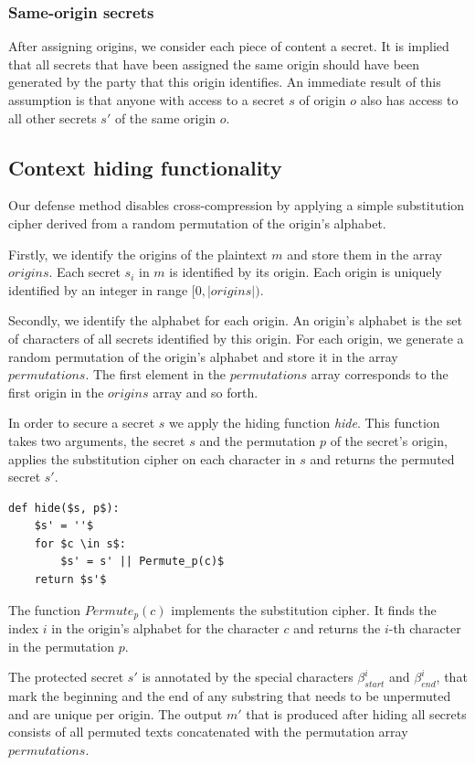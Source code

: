 \subsubsection{Same-origin secrets}
After assigning origins, we consider each piece of content a secret. It is
implied that all secrets that have been assigned the same origin should have
been generated by the party that this origin identifies. An immediate result of
this assumption is that anyone with access to a secret $s$ of origin $o$ also
has access to all other secrets $s'$ of the same origin $o$.

\subsection{Context hiding functionality}
Our defense method disables cross-compression by applying a simple substitution
cipher derived from a random permutation of the origin's alphabet.

Firstly, we identify the origins of the plaintext $m$ and store them in the
array $origins$. Each secret $s_i$ in $m$ is identified by its origin. Each
origin is uniquely identified by an integer in range $[0, |origins|)$.

Secondly, we identify the alphabet for each origin. An origin's alphabet is the
set of characters of all secrets identified by this origin. For each origin, we
generate a random permutation of the origin's alphabet and store it in the array
$permutations$. The first element in the $permutations$ array corresponds to the
first origin in the $origins$ array and so forth.

In order to secure a secret $s$ we apply the hiding function \textit{hide}. This
function takes two arguments, the secret $s$ and the permutation $p$ of the
secret's origin, applies the substitution cipher on each character in $s$ and
returns the permuted secret $s'$.

\begin{lstlisting}[texcl,mathescape,basicstyle=\small]
def hide($s, p$):
    $s' = ''$
    for $c \in s$:
        $s' = s' || Permute_p(c)$
    return $s'$
\end{lstlisting}

The function $Permute_p(c)$ implements the substitution cipher. It finds the
index $i$ in the origin's alphabet for the character $c$ and returns the $i$-th
character in the permutation $p$.

The protected secret $s'$ is annotated by the special characters
$\beta_{start}^i$ and $\beta_{end}^i$, that mark the beginning and the end of any
substring that needs to be unpermuted and are unique per origin. The output $m'$
that is produced after hiding all secrets consists of all permuted texts
concatenated with the permutation array $permutations$.

